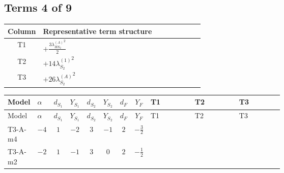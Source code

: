 \documentclass[8pt]{article}
\begin{document}
\begin{landscape}
\subsection*{Terms 4 of 9}
\begin{center}
\begin{tabular}{@{}c >{\raggedright\arraybackslash}p{0.82\linewidth}@{}}
\toprule
Column & Representative term structure \\
\midrule
T1 & \(\displaystyle +\frac{3 {\lambda_{HS_2}^{(A)}}^2}{2}\) \\
\midrule
T2 & \(\displaystyle +14 {\lambda_{S_2}^{(1)}}^2\) \\
\midrule
T3 & \(\displaystyle +26 {\lambda_{S_2}^{(A)}}^2\) \\
\midrule
\bottomrule
\end{tabular}
\end{center}
\smallskip
\tiny
\begin{longtable}{@{}llcccccc >{\raggedright\arraybackslash}p{0.21\linewidth} >{\raggedright\arraybackslash}p{0.21\linewidth} >{\raggedright\arraybackslash}p{0.21\linewidth}@{}}
\toprule
Model & $\alpha$ & $d_{S_1}$ & $Y_{S_1}$ & $d_{S_2}$ & $Y_{S_2}$ & $d_F$ & $Y_F$ & T1 & T2 & T3 \\
\midrule
\endfirsthead
\toprule
Model & $\alpha$ & $d_{S_1}$ & $Y_{S_1}$ & $d_{S_2}$ & $Y_{S_2}$ & $d_F$ & $Y_F$ & T1 & T2 & T3 \\
\midrule
\endhead
T3-A-m4 & $-4$ & $1$ & $-2$ & $3$ & $-1$ & $2$ & $-\frac{3}{2}$ & \scriptsize\adjustbox{max width=\linewidth}{$\begin{gathered} +\frac{3 {\lambda_{HS_2}^{(A)}}^2}{2}\end{gathered}$} & \scriptsize\adjustbox{max width=\linewidth}{$\begin{gathered} +14 {\lambda_{S_2}^{(1)}}^2\end{gathered}$} & \scriptsize\adjustbox{max width=\linewidth}{$\begin{gathered} +26 {\lambda_{S_2}^{(A)}}^2\end{gathered}$} \\
\midrule
T3-A-m2 & $-2$ & $1$ & $-1$ & $3$ & $0$ & $2$ & $-\frac{1}{2}$ & \scriptsize\adjustbox{max width=\linewidth}{$\begin{gathered} +\frac{3 {\lambda_{HS_2}^{(A)}}^2}{2}\end{gathered}$} & \scriptsize\adjustbox{max width=\linewidth}{$\begin{gathered} +14 {\lambda_{S_2}^{(1)}}^2\end{gathered}$} & \scriptsize\adjustbox{max width=\linewidth}{$\begin{gathered} +26 {\lambda_{S_2}^{(A)}}^2\end{gathered}$} \\

\end{longtable}
\end{landscape}
\end{document}
